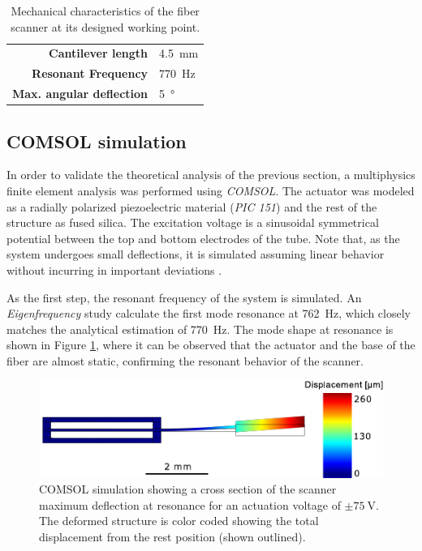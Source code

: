 \begin{table}[h!]\centering
	\caption{Mechanical characteristics of the fiber scanner at its designed working point.}
	\begin{tabular}{rl}\\
		\hline
		\textbf{Cantilever length} & \SI{4.5}{\milli\meter} \\ 
		\textbf{Resonant Frequency} & \SI{770}{\hertz} \\ 
		\textbf{Max. angular deflection} & \SI{5}{\degree} \\ 
		\hline
	\end{tabular} 
    \label{tab:mech}
\end{table}

\subsection{COMSOL simulation}

In order to validate the theoretical analysis of the previous section, a multiphysics finite element analysis was performed using \textit{COMSOL}. The actuator was modeled as a radially polarized piezoelectric material (\textit{PIC 151}) and the rest of the structure as fused silica. The excitation voltage is a sinusoidal symmetrical potential between the top and bottom electrodes of the tube. Note that, as the system undergoes small deflections, it is simulated assuming linear behavior without incurring in important deviations \cite{Fertis2006}.

As the first step, the resonant frequency of the system is simulated. An \textit{Eigenfrequency} study calculate the first mode resonance at \SI{762}{\hertz}, which closely matches the analytical estimation of \SI{770}{\hertz}. The mode shape at resonance is shown in Figure \ref{fig:defle}, where it can be observed that the actuator and the base of the fiber are almost static, confirming the resonant behavior of the scanner.

\begin{figure}[h!]\centering
      \includegraphics[width=10 cm]{figures/30_DesignSimulation/Mechanical/deflection.pdf}
      \caption{COMSOL simulation showing a cross section of the scanner maximum deflection at resonance for an actuation voltage of $\pm \SI{75}{\volt}$. The deformed structure is color coded showing the total displacement from the rest position (shown outlined). }
      \label{fig:defle}
\end{figure}

